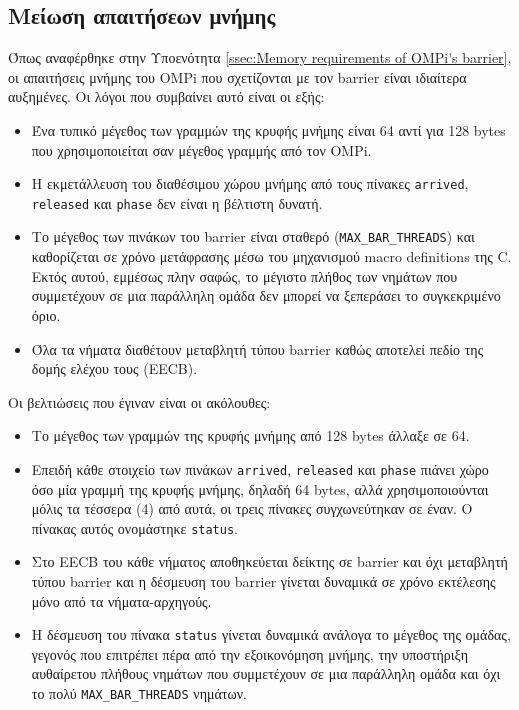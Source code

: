 \subsection{Μείωση απαιτήσεων μνήμης}
Όπως αναφέρθηκε στην Υποενότητα \ref{ssec:Memory requirements of OMPi's barrier}, οι απαιτήσεις μνήμης του OMPi που σχετίζονται με τον barrier είναι ιδιαίτερα αυξημένες. Οι λόγοι που συμβαίνει αυτό είναι οι εξής:
\begin{itemize}
	\item Ένα τυπικό μέγεθος των γραμμών της κρυφής μνήμης είναι 64 αντί για 128 bytes που χρησιμοποιείται σαν μέγεθος γραμμής από τον OMPi.
	\item Η εκμετάλλευση του διαθέσιμου χώρου μνήμης από τους πίνακες \texttt{arrived}, \texttt{released} και \texttt{phase} δεν είναι η βέλτιστη δυνατή.
	\item Το μέγεθος των πινάκων του barrier είναι σταθερό (\texttt{MAX\_BAR\_THREADS}) και καθορίζεται σε χρόνο μετάφρασης μέσω του μηχανισμού macro definitions της C. Εκτός αυτού, εμμέσως πλην σαφώς, το μέγιστο πλήθος των νημάτων που συμμετέχουν σε μια παράλληλη ομάδα δεν μπορεί να ξεπεράσει το συγκεκριμένο όριο. 
	\item Όλα τα νήματα διαθέτουν μεταβλητή τύπου barrier καθώς αποτελεί πεδίο της δομής ελέχου τους (EECB).
\end{itemize}

\noindent Οι βελτιώσεις που έγιναν είναι οι ακόλουθες:
\begin{itemize}
	\item Το μέγεθος των γραμμών της κρυφής μνήμης από 128 bytes άλλαξε σε 64.
	\item Επειδή κάθε στοιχείο των πινάκων \texttt{arrived}, \texttt{released} και \texttt{phase} πιάνει χώρο όσο μία γραμμή της κρυφής μνήμης, δηλαδή 64 bytes, αλλά χρησιμοποιούνται μόλις τα τέσσερα (4) από αυτά, οι τρεις πίνακες συγχωνεύτηκαν σε έναν. Ο πίνακας αυτός ονομάστηκε \texttt{status}.
	\item Στο EECB του κάθε νήματος αποθηκεύεται δείκτης σε barrier και όχι μεταβλητή τύπου barrier και η δέσμευση του barrier γίνεται δυναμικά σε χρόνο εκτέλεσης μόνο από τα νήματα-αρχηγούς.
	\item Η δέσμευση του πίνακα \texttt{status} γίνεται δυναμικά ανάλογα το μέγεθος της ομάδας, γεγονός που επιτρέπει πέρα από την εξοικονόμηση μνήμης, την υποστήριξη αυθαίρετου πλήθους νημάτων που συμμετέχουν σε μια παράλληλη ομάδα και όχι το πολύ \texttt{MAX\_BAR\_THREADS} νημάτων.
\end{itemize}

